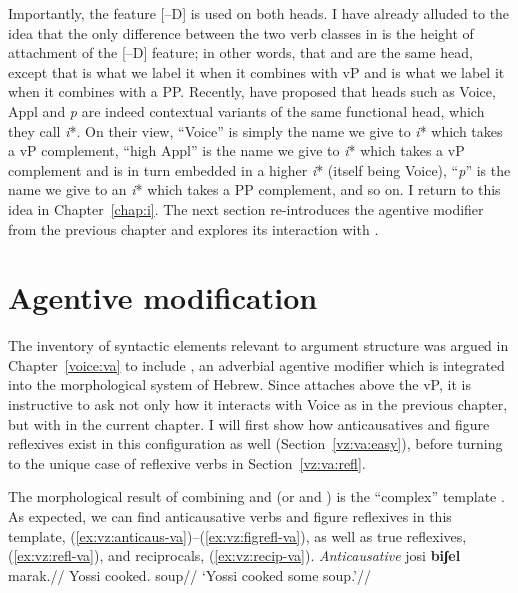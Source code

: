 Importantly, the feature [--D] is used on both heads. I have already alluded to the idea that the only difference between the two verb classes in {\tnif} is the height of attachment of the [--D] feature; in other words, that {\vz} and {\pz} are the same head, except that {\vz} is what we label it when it combines with vP and {\pz} is what we label it when it combines with a PP. Recently, \cite{woodmarantz17} have proposed that heads such as Voice, Appl and \emph{p} are indeed contextual variants of the same functional head, which they call \emph{i}*. On their view, ``Voice'' is simply the name we give to \emph{i}* which takes a vP complement, ``high Appl'' is the name we give to \emph{i}* which takes a vP complement and is in turn embedded in a higher \emph{i}* (itself being Voice), ``\emph{p}'' is the name we give to an \emph{i}* which takes a PP complement, and so on. I return to this idea in Chapter~\ref{chap:i}. The next section re-introduces the agentive modifier {\va} from the previous chapter and explores its interaction with {\vz}.


\section{Agentive modification} \label{vz:va}
The inventory of syntactic elements relevant to argument structure was argued in Chapter~\ref{voice:va} to include {\va}, an adverbial agentive modifier which is integrated into the morphological system of Hebrew. Since {\va} attaches above the vP, it is instructive to ask not only how it interacts with Voice as in the previous chapter, but with {\vz} in the current chapter. I will first show how anticausatives and figure reflexives exist in this configuration as well (Section~\ref{vz:va:easy}), before turning to the unique case of reflexive verbs in Section~\ref{vz:va:refl}.

The morphological result of combining {\pz} and {\va} (or {\pz} and {\va}) is the ``complex'' template {\thit}. As expected, we can find anticausative verbs and figure reflexives in this template, (\ref{ex:vz:anticaus-va})--(\ref{ex:vz:figrefl-va}), as well as true reflexives, (\ref{ex:vz:refl-va}), and reciprocals, (\ref{ex:vz:recip-va}).
\pex\label{ex:vz:anticaus-va}\textit{Anticausative}
	\a \begingl
		\gla josi \textbf{biʃel} marak.//
		\glb Yossi cooked. soup//
		\glft `Yossi cooked some soup.'//
	\endgl
	
